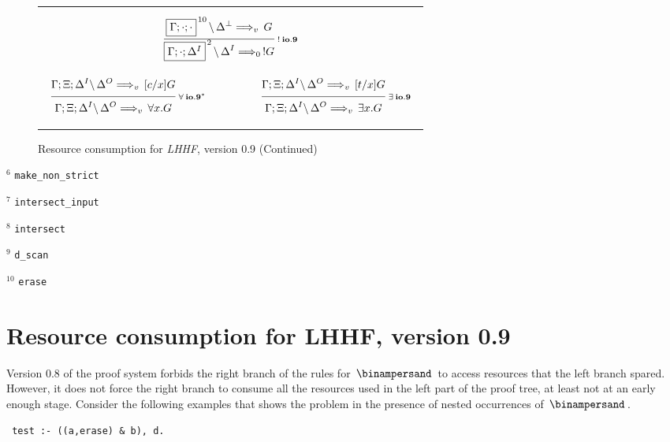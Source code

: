 \begin{figure}[t]
\begin{center}
\begin{tabular}{|c|}
      \\ \\ \\
      $\ruleI
        {\ioIX{\fb{\G;\cdot;\cdot}{10}}{\D^\Bot}{G}{v}}
        {\ioIX{\fb{\G;\cdot;\D^I}{2}}{\D^I}{!G}{0}}
        {! \: io.9}$

      \\ \\ \\
      $\begin{array}{ccc}
        \ruleI
          {\ioIX{\G;\X;\D^I}{\D^O}{[c/x]G}{v}}
          {\ioIX{\G;\X;\D^I}{\D^O}{\A x. G}{v}}
          {\A \: io.9^*}
      &
        \hspace{3em}
      &
        \ruleI
          {\ioIX{\G;\X;\D^I}{\D^O}{[t/x]G}{v}}
          {\ioIX{\G;\X;\D^I}{\D^O}{\E x. G}{v}}
          {\E \: io.9}
      \end{array}$
      \\ \\
      \hline
    \end{tabular}

    \caption{Resource consumption for {\em LHHF}, version 0.9 (Continued)}
    \label{fig:RC_IXa2}
  \end{center}
\end{figure}

\bigskip

$^6$ {\tt make\_non\_strict}

$^7$ {\tt intersect\_input}

$^8$ {\tt intersect}

$^9$ {\tt d\_scan}

$^{10}$ {\tt erase}


\newpage
\section{Resource consumption for LHHF,  version 0.9}
\label{s:RC_IXa}

Version 0.8 of the proof system forbids the right branch of the rules for
$\With$ to access resources that the left branch spared. However, it does
not force the right branch to consume all the resources used in the left part
of the proof tree, at least not at an early enough stage. Consider the
following examples that shows the problem in the presence of nested
occurrences of $\With$.

\medskip

{\tt \hspace*{2em} \indent test :- ((a,erase) \& b), d.\rule[-2ex]{0ex}{1ex}}

